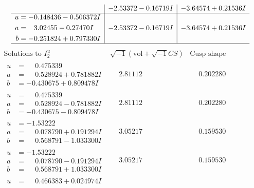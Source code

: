 \documentclass[1p]{elsarticle_modified}
\theoremstyle{definition}
\newcommand{\I}{\sqrt{-1}}
\begin{document}
$$\begin{array}{c|c|c}
 & -2.53372 - 0.16719 I & -3.64574 + 0.21536 I \\ \hline\begin{aligned}
u &= -0.148436 - 0.506372 I \\
a &= \phantom{-}3.02455 - 0.27470 I \\
b &= -0.251824 + 0.797330 I\end{aligned}
 & -2.53372 - 0.16719 I & -3.64574 + 0.21536 I\\
 \hline 
 \end{array}$$\newpage$$\begin{array}{c|c|c}  
\text{Solutions to }I^u_{2}& \I (\text{vol} + \sqrt{-1}CS) & \text{Cusp shape}\\
 \hline 
\begin{aligned}
u &= \phantom{-}0.475339\phantom{ +0.000000I} \\
a &= \phantom{-}0.528924 + 0.781882 I \\
b &= -0.430675 + 0.809478 I\end{aligned}
 & \phantom{-}2.81112\phantom{ +0.000000I} & \phantom{-}0.202280\phantom{ +0.000000I} \\ \hline\begin{aligned}
u &= \phantom{-}0.475339\phantom{ +0.000000I} \\
a &= \phantom{-}0.528924 - 0.781882 I \\
b &= -0.430675 - 0.809478 I\end{aligned}
 & \phantom{-}2.81112\phantom{ +0.000000I} & \phantom{-}0.202280\phantom{ +0.000000I} \\ \hline\begin{aligned}
u &= -1.53222\phantom{ +0.000000I} \\
a &= \phantom{-}0.078790 + 0.191294 I \\
b &= \phantom{-}0.568791 - 1.033300 I\end{aligned}
 & \phantom{-}3.05217\phantom{ +0.000000I} & \phantom{-}0.159530\phantom{ +0.000000I} \\ \hline\begin{aligned}
u &= -1.53222\phantom{ +0.000000I} \\
a &= \phantom{-}0.078790 - 0.191294 I \\
b &= \phantom{-}0.568791 + 1.033300 I\end{aligned}
 & \phantom{-}3.05217\phantom{ +0.000000I} & \phantom{-}0.159530\phantom{ +0.000000I} \\ \hline\begin{aligned}
u &= \phantom{-}0.466383 + 0.024974 I \\

\end{aligned}
\end{array}$$
\end{document}
